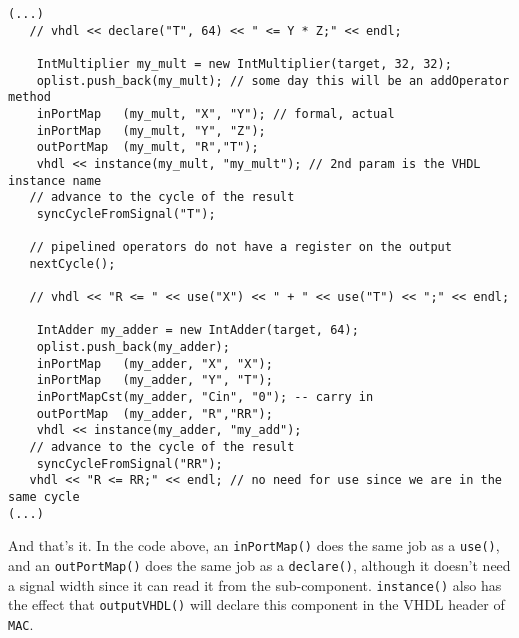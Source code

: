\documentclass{article}
\begin{document}
\begin{verbatim}
(...)
   // vhdl << declare("T", 64) << " <= Y * Z;" << endl;

	IntMultiplier my_mult = new IntMultiplier(target, 32, 32);
	oplist.push_back(my_mult); // some day this will be an addOperator method
	inPortMap   (my_mult, "X", "Y"); // formal, actual
	inPortMap   (my_mult, "Y", "Z");
	outPortMap  (my_mult, "R","T");
	vhdl << instance(my_mult, "my_mult"); // 2nd param is the VHDL instance name
   // advance to the cycle of the result
	syncCycleFromSignal("T"); 

   // pipelined operators do not have a register on the output 
   nextCycle();

   // vhdl << "R <= " << use("X") << " + " << use("T") << ";" << endl;

	IntAdder my_adder = new IntAdder(target, 64);
	oplist.push_back(my_adder);
	inPortMap   (my_adder, "X", "X");
	inPortMap   (my_adder, "Y", "T");
	inPortMapCst(my_adder, "Cin", "0"); -- carry in
	outPortMap  (my_adder, "R","RR");
	vhdl << instance(my_adder, "my_add");
   // advance to the cycle of the result
	syncCycleFromSignal("RR"); 
   vhdl << "R <= RR;" << endl; // no need for use since we are in the same cycle
(...)
\end{verbatim}


And that's it. In the code above, an \verb!inPortMap()! does the same
job as a \verb!use()!, and an \verb!outPortMap()! does the same job as
a \verb!declare()!, although it doesn't need a signal width since it
can read it from the sub-component. \verb!instance()! also has the
effect that \verb!outputVHDL()! will declare this component in the
VHDL header of \verb!MAC!.
\end{document}
